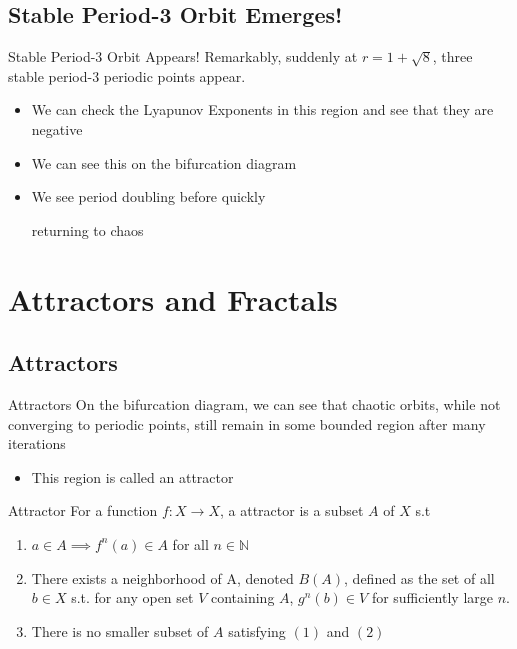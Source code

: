 \documentclass[
	11pt, %
]{beamer}
\begin{document}
\subsection{Stable Period-3 Orbit Emerges!}
\begin{frame}{Stable Period-3 Orbit Appears!}
    Remarkably, suddenly at $r=1+\sqrt{8}$, three stable period-3 periodic points appear. 
    \begin{itemize}
        \item We can check the Lyapunov Exponents in this region and see that they are negative
        \item We can see this on the bifurcation diagram
        \item We see period doubling before quickly
        
        returning to chaos
    \end{itemize}
\end{frame}
\section{Attractors and Fractals}
\subsection{Attractors}
\begin{frame}{Attractors}
On the bifurcation diagram, we can see that chaotic orbits, while not converging to periodic points, still remain in some bounded region after many iterations
\begin{itemize}
    \item This region is called an attractor
\end{itemize}
\begin{block}{Attractor} 
For a function $f:X\to X$, a attractor is a subset $A$ of $X$ s.t
\begin{enumerate}
	\item $a\in A\implies f^n(a)\in A$ for all $n\in\mathbb{N}$
    \item There exists a neighborhood of A, denoted $B(A)$, defined as the set of all $b\in X$ s.t. for any open set $V$ containing $A$, $g^n(b)\in V$ for sufficiently large $n$.
    \item There is no smaller subset of $A$ satisfying $(1)$ and $(2)$
\end{enumerate}
\end{block}



\end{frame}
\end{document}
